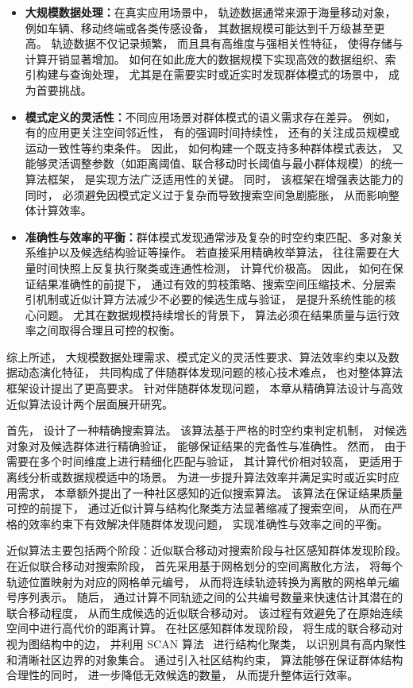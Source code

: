 \begin{itemize}
    \item \textbf{大规模数据处理：}在真实应用场景中， 轨迹数据通常来源于海量移动对象， 例如车辆、移动终端或各类传感设备， 其数据规模可能达到千万级甚至更高。 轨迹数据不仅记录频繁， 而且具有高维度与强相关性特征， 使得存储与计算开销显著增加。 如何在如此庞大的数据规模下实现高效的数据组织、索引构建与查询处理， 尤其是在需要实时或近实时发现群体模式的场景中， 成为首要挑战。

    \item \textbf{模式定义的灵活性：}不同应用场景对群体模式的语义需求存在差异。 例如， 有的应用更关注空间邻近性， 有的强调时间持续性， 还有的关注成员规模或运动一致性等约束条件。 因此， 如何构建一个既支持多种群体模式表达， 又能够灵活调整参数（如距离阈值、联合移动时长阈值与最小群体规模）的统一算法框架， 是实现方法广泛适用性的关键。 同时， 该框架在增强表达能力的同时， 必须避免因模式定义过于复杂而导致搜索空间急剧膨胀， 从而影响整体计算效率。

    \item \textbf{准确性与效率的平衡：}群体模式发现通常涉及复杂的时空约束匹配、多对象关系维护以及候选结构验证等操作。 若直接采用精确枚举算法， 往往需要在大量时间快照上反复执行聚类或连通性检测， 计算代价极高。 因此， 如何在保证结果准确性的前提下， 通过有效的剪枝策略、搜索空间压缩技术、分层索引机制或近似计算方法减少不必要的候选生成与验证， 是提升系统性能的核心问题。 尤其在数据规模持续增长的背景下， 算法必须在结果质量与运行效率之间取得合理且可控的权衡。

\end{itemize}

综上所述， 大规模数据处理需求、模式定义的灵活性要求、算法效率约束以及数据动态演化特征， 共同构成了伴随群体发现问题的核心技术难点， 也对整体算法框架设计提出了更高要求。 针对伴随群体发现问题， 本章从精确算法设计与高效近似算法设计两个层面展开研究。

首先， 设计了一种精确搜索算法。 该算法基于严格的时空约束判定机制， 对候选对象对及候选群体进行精确验证， 能够保证结果的完备性与准确性。 然而， 由于需要在多个时间维度上进行精细化匹配与验证， 其计算代价相对较高， 更适用于离线分析或数据规模适中的场景。 为进一步提升算法效率并满足实时或近实时应用需求， 本章额外提出了一种社区感知的近似搜索算法。 该算法在保证结果质量可控的前提下， 通过近似计算与结构化聚类方法显著缩减了搜索空间， 从而在严格的效率约束下有效解决伴随群体发现问题， 实现准确性与效率之间的平衡。

近似算法主要包括两个阶段：近似联合移动对搜索阶段与社区感知群体发现阶段。 在近似联合移动对搜索阶段， 首先采用基于网格划分的空间离散化方法， 将每个轨迹位置映射为对应的网格单元编号， 从而将连续轨迹转换为离散的网格单元编号序列表示。 随后， 通过计算不同轨迹之间的公共编号数量来快速估计其潜在的联合移动程度， 从而生成候选的近似联合移动对。 该过程有效避免了在原始连续空间中进行高代价的距离计算。 在社区感知群体发现阶段， 将生成的联合移动对视为图结构中的边， 并利用 SCAN 算法~ 进行结构化聚类， 以识别具有高内聚性和清晰社区边界的对象集合。 通过引入社区结构约束， 算法能够在保证群体结构合理性的同时， 进一步降低无效候选的数量， 从而提升整体运行效率。

